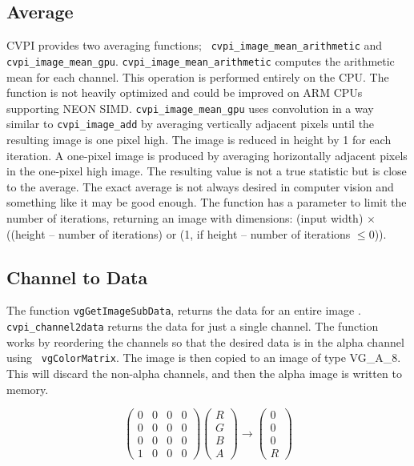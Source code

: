 \documentclass[12pt]{report}
\begin{document}
\subsection{Average}
\label{sec-3-11-1}
CVPI provides two averaging functions; {\tt
  cvpi\_image\_mean\_arithmetic} and {\tt cvpi\_image\_mean\_gpu}.
{\tt cvpi\_image\_mean\_arithmetic} computes the arithmetic mean for
each channel. This operation is performed entirely on the CPU. The
function is not heavily optimized and could be improved on ARM CPUs
supporting NEON SIMD. {\tt cvpi\_image\_mean\_gpu} uses convolution in
a way similar to {\tt cvpi\_image\_add} by averaging vertically
adjacent pixels until the resulting image is one pixel high. The image
is reduced in height by 1 for each iteration. A one-pixel image is
produced by averaging horizontally adjacent pixels in the one-pixel
high image.  The resulting value is not a true statistic but is close
to the average. The exact average is not always desired in computer
vision and something like it may be good enough. The function has a
parameter to limit the number of iterations, returning an image with
dimensions: (input width) $\times$ ((height -- number of iterations)
or (1, if height -- number of iterations $\le 0$)).

\subsection{Channel to Data}
\label{sec-3-11-2}
The function {\tt vgGetImageSubData}, returns the data for an entire
image \cite{openvg}. {\tt cvpi\_channel2data} returns the data for
just a single channel. The function works by reordering the channels
so that the desired data is in the alpha channel using {\tt
  vgColorMatrix}. The image is then copied to an image of type
VG\_A\_8. This will discard the non-alpha channels, and then the alpha
image is written to memory.

    \[
 \begin{pmatrix} 0 & 0 & 0 & 0 \\ 0 & 0 & 0 & 0 \\ 0 & 0 & 0 & 0 \\ 1 & 0 & 0 & 0 \end{pmatrix}
          \begin{pmatrix} R \\ G \\ B \\ A \end{pmatrix} \to \begin{pmatrix} 0 \\ 0 \\ 0 \\ R \end{pmatrix}
\]
\end{document}

